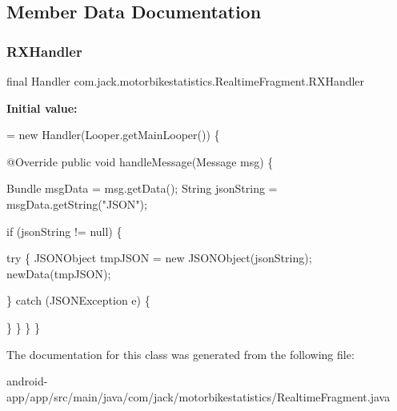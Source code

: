 \subsection{Member Data Documentation}
\mbox{\label{classcom_1_1jack_1_1motorbikestatistics_1_1_realtime_fragment_a7b39a40287200b7530c2d935e6717fa6}} 
\subsubsection{\texorpdfstring{R\+X\+Handler}{RXHandler}}
{\footnotesize\ttfamily final Handler com.\+jack.\+motorbikestatistics.\+Realtime\+Fragment.\+R\+X\+Handler}

{\bfseries Initial value\+:}
\begin{DoxyCode}
= \textcolor{keyword}{new} Handler(Looper.getMainLooper()) \{

        @Override
        \textcolor{keyword}{public} \textcolor{keywordtype}{void} handleMessage(Message msg) \{

            Bundle msgData = msg.getData();
            String jsonString = msgData.getString(\textcolor{stringliteral}{"JSON"});

            \textcolor{keywordflow}{if} (jsonString != null) \{

                
                \textcolor{keywordflow}{try} \{
                    JSONObject tmpJSON = \textcolor{keyword}{new} JSONObject(jsonString);
                    newData(tmpJSON);

                \} \textcolor{keywordflow}{catch} (JSONException e) \{
                    
                \}
            \}
        \}
    \}
\end{DoxyCode}


The documentation for this class was generated from the following file\+:\begin{DoxyCompactItemize}
\item 
android-\/app/app/src/main/java/com/jack/motorbikestatistics/Realtime\+Fragment.\+java\end{DoxyCompactItemize}
